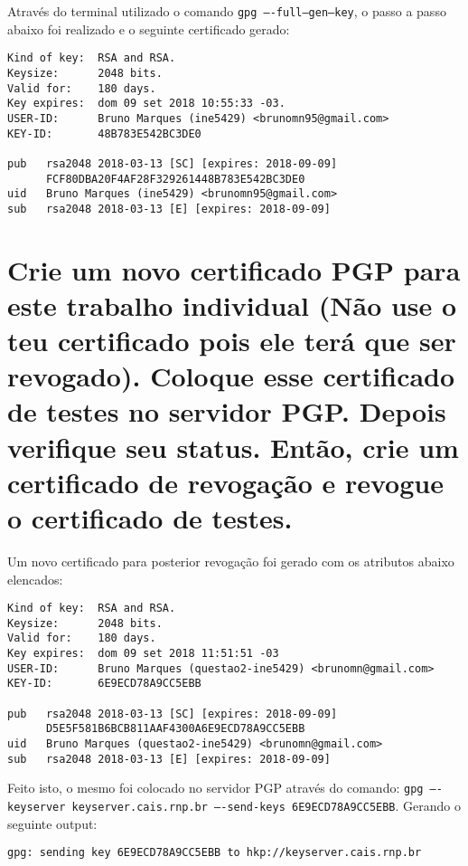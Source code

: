 \documentclass[
    article,            %
    11pt,               %
    oneside,            %
    a4paper,            %
    english,            %
    brazil,             %
    sumario=tradicional,
    ]{abntex2}
\begin{document}
Através do terminal utilizado o comando \texttt{gpg ----full--gen--key}, o passo a passo abaixo foi realizado e o seguinte certificado gerado:

\begin{Verbatim}[frame=single]
Kind of key:  RSA and RSA.
Keysize:      2048 bits.
Valid for:    180 days.
Key expires:  dom 09 set 2018 10:55:33 -03.
USER-ID:      Bruno Marques (ine5429) <brunomn95@gmail.com>
KEY-ID:       48B783E542BC3DE0
    
pub   rsa2048 2018-03-13 [SC] [expires: 2018-09-09]
      FCF80DBA20F4AF28F329261448B783E542BC3DE0
uid   Bruno Marques (ine5429) <brunomn95@gmail.com>
sub   rsa2048 2018-03-13 [E] [expires: 2018-09-09]
\end{Verbatim}

\section{Crie um novo certificado PGP para este trabalho individual (Não use o teu certificado pois ele terá que ser revogado). Coloque esse certificado de testes no servidor PGP. Depois verifique seu status. Então, crie um certificado de revogação e revogue o certificado de testes.}

Um novo certificado para posterior revogação foi gerado com os atributos abaixo elencados:

\begin{Verbatim}[frame=single]
Kind of key:  RSA and RSA.
Keysize:      2048 bits.
Valid for:    180 days.
Key expires:  dom 09 set 2018 11:51:51 -03
USER-ID:      Bruno Marques (questao2-ine5429) <brunomn@gmail.com>
KEY-ID:       6E9ECD78A9CC5EBB

pub   rsa2048 2018-03-13 [SC] [expires: 2018-09-09]
      D5E5F581B6BCB811AAF4300A6E9ECD78A9CC5EBB
uid   Bruno Marques (questao2-ine5429) <brunomn@gmail.com>
sub   rsa2048 2018-03-13 [E] [expires: 2018-09-09]
\end{Verbatim}

Feito isto, o mesmo foi colocado no servidor PGP através do comando: \texttt{gpg ----keyserver keyserver.cais.rnp.br ----send-keys 6E9ECD78A9CC5EBB}. Gerando o seguinte output:

\begin{Verbatim}[frame=single]
gpg: sending key 6E9ECD78A9CC5EBB to hkp://keyserver.cais.rnp.br
\end{Verbatim}
\end{document}
